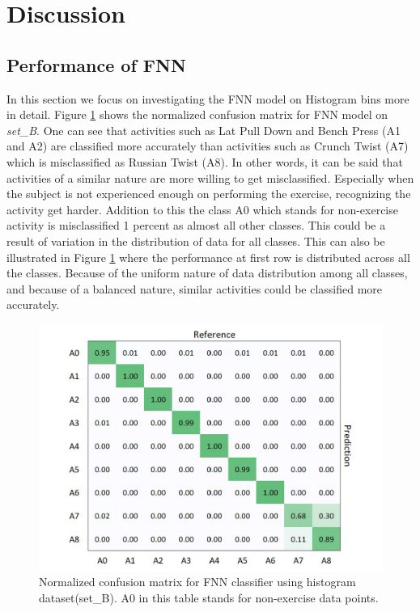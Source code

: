 \documentclass[journal,article,submit,moreauthors,pdftex]{Definitions/mdpi}
\begin{document}
\section{Discussion}
\subsection{Performance of FNN}
In this section we focus on investigating the FNN model on Histogram bins more in detail. Figure \ref{fig:fnn_hbins_confusion_matrix} shows the normalized confusion matrix for FNN model on \textit{set\_B}. One can see that activities such as Lat Pull Down and Bench Press (A1 and A2) are classified more accurately than activities such as Crunch Twist (A7) which is misclassified as Russian Twist (A8). In other words, it can be said that activities of a similar nature are more willing to get misclassified. Especially when the subject is not experienced enough on performing the exercise, recognizing the activity get harder. Addition to this the class A0 which stands for non-exercise activity is misclassified 1 percent as almost all other classes. This could be a result of variation in the distribution of data for all classes. This can also be illustrated in Figure \ref{fig:fnn_hbins_confusion_matrix} where the performance at first row is distributed across all the classes. Because of the uniform nature of data distribution among all classes, and because of a balanced nature, similar activities could be classified more accurately.\\
\begin{figure}[H]
	\centering
	\includegraphics[width=7 cm]{Definitions/images/fnn_histogram_set.jpg}
	\caption{Normalized confusion matrix for FNN classifier using histogram dataset(set\_B). A0 in this table stands for non-exercise data points.}
	\label{fig:fnn_hbins_confusion_matrix}
\end{figure} 
\end{document}
